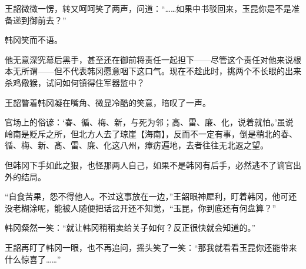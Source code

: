 王韶微微一愣，转又呵呵笑了两声，问道：“……如果中书驳回来，玉昆你是不是准备递到御前去？”

韩冈笑而不语。

他无意深究幕后黑手，甚至还在御前将责任一起担下——尽管这个责任对他来说根本无所谓——但不代表韩冈愿意咽下这口气。现在不趁此时，挑两个不长眼的出来杀鸡儆猴，试问如何镇得住军器监中？

王韶瞥着韩冈凝在嘴角、微显冷酷的笑意，暗叹了一声。

官场上的俗谚：‘春、循、梅、新，与死为邻；高、雷、廉、化，说着就怕。’虽说岭南是贬斥之所，但北方人去了琼崖【海南】，反而不一定有事，倒是稍北的春、循、梅、新、髙、雷、廉、化这八州，瘴疠遍地，去者往往无北返之望。

但韩冈下手如此之狠，也怪那两人自己，如果不是韩冈有后手，必然逃不了谪官出外的结局。

“自食苦果，怨不得他人。不过这事放在一边，”王韶眼神犀利，盯着韩冈，他可还没老糊涂呢，能被人随便把话岔开还不知觉，“玉昆，你到底还有何盘算？”

韩冈粲然一笑：“就让韩冈稍稍卖给关子如何？反正很快就会知道的。”

王韶再盯了韩冈一眼，也不再追问，摇头笑了一笑：“那我就看看玉昆你还能带来什么惊喜了……”

